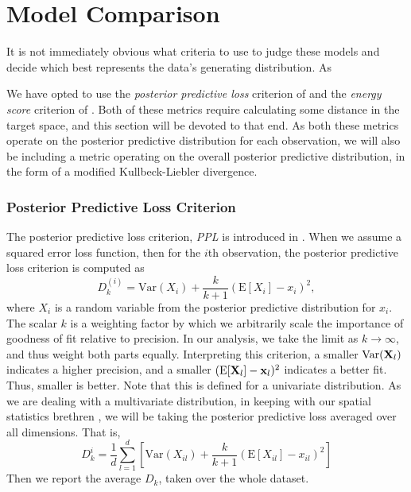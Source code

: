 \section{Model Comparison}
It is not immediately obvious what criteria to use to judge these models and decide which best
  represents the data's generating distribution.  As



  We have opted to use the
  \emph{posterior predictive loss} criterion of \cite{gelfand1998} and the
  \emph{energy score} criterion of \cite{gneiting2007}.  Both of these
  metrics require calculating some distance in the target space, and this section will be devoted
  to that end.  As both these metrics operate on the posterior predictive distribution for each
  observation, we will also be including a metric operating on the overall posterior predictive
  distribution, in the form of a modified Kullbeck-Liebler divergence.

\subsubsection{Posterior Predictive Loss Criterion}
The posterior predictive loss criterion, \emph{PPL} is introduced in \cite{gelfand1998}.  When we
  assume a squared error loss function, then for the $i$th observation, the posterior predictive
  loss criterion is computed as
  \begin{equation}
    \label{eq:ppl}
    D_{k}^{(i)} = \text{Var}(X_i) + \frac{k}{k + 1}\left(\text{E}[X_i] - x_i\right)^2,
  \end{equation}
  where $X_i$ is a random variable from the posterior predictive distribution for $x_i$.  The
  scalar $k$ is a weighting factor by which we arbitrarily scale the importance of goodness of fit
  relative to precision.  In our analysis, we take the limit as $k\to\infty$, and thus weight both
  parts equally.  Interpreting this criterion, a smaller $\text{Var}({\bf X}_l)$ indicates a higher
  precision, and a smaller $(\text{E}[{\bf X}_l] - {\bf x}_l)^2$  indicates a better fit.  Thus,
  smaller is better.  Note that this is defined for a univariate distribution.  As we are dealing
  with a multivariate distribution, in keeping with our spatial statistics brethren
  , we will be taking the posterior predictive loss
  averaged over all dimensions.  That is,
  \begin{equation}
    \label{eq:ppl2}
    D_k^{i} = \frac{1}{d}\sum_{l = 1}^{d}\left[\text{Var}(X_{il}) + \frac{k}{k+1}\left(\text{E}[X_{il}] - x_{il}\right)^2\right]
  \end{equation}
  Then we report the average $D_k$, taken over the whole dataset.

